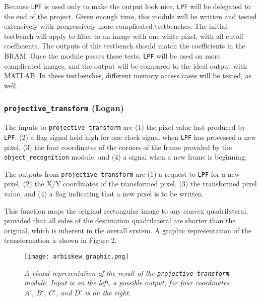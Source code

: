 \documentclass[10pt]{article}
\begin{document}
Because {\tt LPF} is used only to make the output look nice, {\tt LPF} will be delegated to the end of the project. Given enough time, this module will be written and tested extensively with progressively more complicated testbenches. The initial testbench will apply to filter to an image with one white pixel, with all cutoff coefficients. The outputs of this testbench should match the coefficients in the BRAM. Once the module passes these tests, {\tt LPF} will be used on more complicated images, and the output will be compared to the ideal output with MATLAB. In these testbenches, different memory access cases will be tested, as well.

\subsubsection{{\tt projective\_transform} (Logan)}
The inputs to {\tt projective\_transform} are (1) the pixel value last produced by {\tt LPF}, (2) a flag signal held high for one clock signal when {\tt LPF} has processed a new pixel, (3) the four coordinates of the corners of the frame provided by the {\tt object\_recognition} module, and (4) a signal when a new frame is beginning.

The outputs from {\tt projective\_transform} are (1) a request to {\tt LPF} for a new pixel, (2) the X/Y coordinates of the transformed pixel, (3) the transformed pixel value, and (4) a flag indicating that a new pixel is to be written.

This function maps the original rectangular image to any convex quadrilateral, provided that all sides of the destination quadrilateral are shorter than the original, which is inherent in the overall system. A graphic representation of the transformation is shown in Figure 2.

\begin{figure}[h!]
\centering
\texttt{[image: arbiskew\_graphic.png]}
\caption{\emph{A visual representation of the result of the {\tt projective\_transform} module. Input is on the left, a possible output, for four coordinates $A\prime$, $B\prime$, $C\prime$, and $D\prime$ is on the right.}}
\end{figure}
\end{document}
